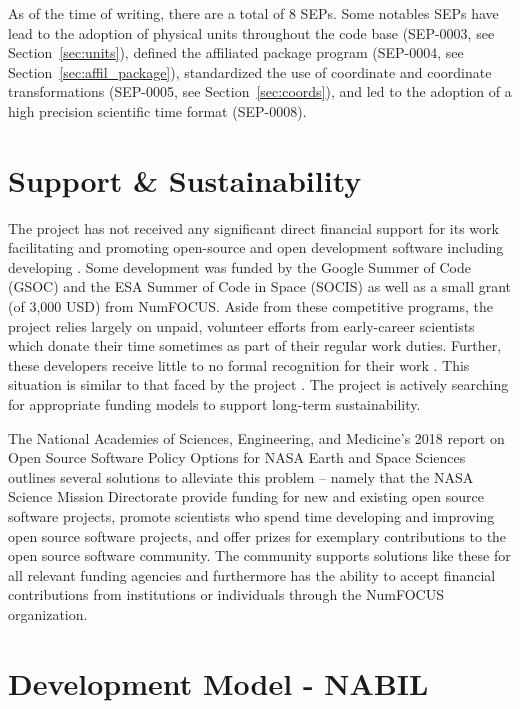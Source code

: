As of the time of writing, there are a total of 8 SEPs. Some notables SEPs have lead to the adoption of physical units throughout the code base (SEP-0003, see Section~\ref{sec:units}), defined the affiliated package program (SEP-0004, see Section~\ref{sec:affil_package}), standardized the use of coordinate and coordinate transformations (SEP-0005, see Section~\ref{sec:coords}), and led to the adoption of a high precision scientific time format (SEP-0008).

\section{Support \& Sustainability}
The \sunpy project has not received any significant direct financial support for its work facilitating and promoting open-source and open development software including developing \sunpypkg. Some development was funded by the Google Summer of Code (GSOC) and the ESA Summer of Code in Space (SOCIS) as well as a small grant (of 3,000 USD) from NumFOCUS. Aside from these competitive programs, the \sunpy project relies largely on unpaid, volunteer efforts from early-career scientists which donate their time sometimes as part of their regular work duties. Further, these developers receive little to no formal recognition for their work \citep{Muna2016}. This situation is similar to that faced by the \astropy project \citep{PriceWhelan:2018ji}. The \sunpy project is actively searching for appropriate funding models to support long-term sustainability. 

The National Academies of Sciences, Engineering, and Medicine's 2018 report on Open Source Software Policy Options for NASA Earth and Space Sciences \citep{NAP2018} outlines several solutions to alleviate this problem -- namely that the NASA Science Mission Directorate provide funding for new and existing open source software projects, promote scientists who spend time developing and improving open source software projects, and offer prizes for exemplary contributions to the open source software community. The \sunpy community supports solutions like these for all relevant funding agencies and furthermore has the ability to accept financial contributions from institutions or individuals through the NumFOCUS organization.

\section{Development Model - NABIL}


